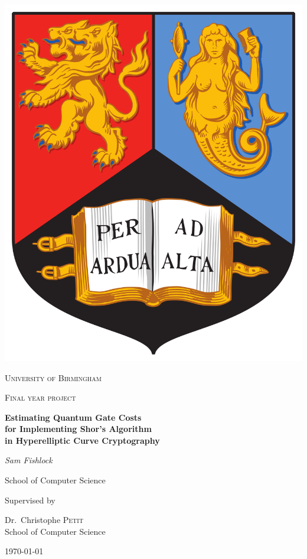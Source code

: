 \begin{titlepage}


\thispagestyle{empty}
\setlength\headheight{0pt} 
\begin{center}

\begin{center}
\includegraphics[width=0.25\linewidth]{img/bham.png}            
\end{center}	

        \vspace{0.25cm}
        {\scshape\LARGE University of Birmingham \par}
        \vspace{0.25cm}
        {\scshape\Large Final year project\par}
        \vspace{0.5cm}

        {\Large\bfseries Estimating Quantum Gate Costs \\for Implementing Shor's Algorithm \\ in Hyperelliptic Curve Cryptography\par}
        
        \vspace{0.5cm}
        {\Large\itshape Sam Fishlock\par}
        School of Computer Science
        \vspace{0.25cm}

\vspace{1cm}
Supervised by\par
Dr.~Christophe \textsc{Petit} \\
School of Computer Science\par
\vspace{1.5cm}
\large
\today

\end{center}

\clearpage
\restoregeometry
\end{titlepage}
